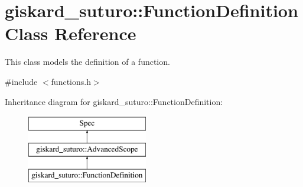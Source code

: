 \hypertarget{classgiskard__suturo_1_1FunctionDefinition}{\section{giskard\-\_\-suturo\-:\-:Function\-Definition Class Reference}
\label{classgiskard__suturo_1_1FunctionDefinition}
}


This class models the definition of a function.  




{\ttfamily \#include $<$functions.\-h$>$}

Inheritance diagram for giskard\-\_\-suturo\-:\-:Function\-Definition\-:\begin{figure}[H]
\begin{center}
\leavevmode
\includegraphics[height=3.000000cm]{classgiskard__suturo_1_1FunctionDefinition}
\end{center}
\end{figure}
